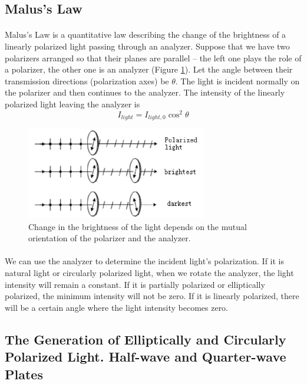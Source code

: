 \documentclass{my_template}
\begin{document}
    \subsection{Malus's Law}
    \paragraph{} Malus's Law is a quantitative law describing the change of the brightness of a linearly polarized light passing through an analyzer. Suppose that we have two polarizers arranged so that their planes are parallel -- the left one plays the role of a polarizer, the other one is an analyzer (Figure \ref{fig:Malus's Law demo}). Let the angle between their transmission directions (polarization axes) be $\theta$. The light is incident normally on the polarizer and then continues to the analyzer. The intensity of the linearly polarized light leaving the analyzer is$$I_{light}=I_{light,0}\cos^2\theta$$
    \begin{figure}[!ht]
        \centering
        \includegraphics[width=0.7\textwidth]{fig/M_Law_demo.png}
        \caption{Change in the brightness of the light depends on the mutual orientation of the polarizer and the analyzer.}
        \label{fig:Malus's Law demo}
    \end{figure}
    \paragraph{} We can use the analyzer to determine the incident light's polarization. If it is natural light or circularly polarized light, when we rotate the analyzer, the light intensity will remain a constant. If it is partially polarized or elliptically polarized, the minimum intensity will not be zero. If it is linearly polarized, there will be a certain angle where the light intensity becomes zero. 
    \subsection{The Generation of Elliptically and Circularly Polarized Light. Half-wave and Quarter-wave Plates}
\end{document}
